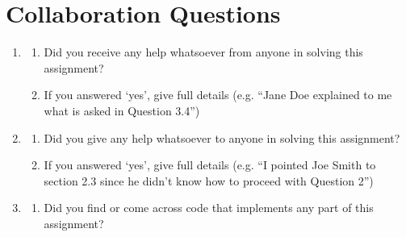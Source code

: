 \section{Collaboration Questions}

\begin{enumerate}
    \item 
    \begin{enumerate}
        \item Did you receive any help whatsoever from anyone in solving this assignment? 
        
        \item If you answered `yes', give full details (e.g. “Jane Doe explained to me what is asked in Question 3.4”)\\
        
        \begin{tcolorbox}[fit,height=4cm, width=15cm, blank, borderline={1pt}{-2pt},nobeforeafter]
\begin{answer}
        
        
\end{answer}
        \end{tcolorbox}
        
    \end{enumerate}
    
    
    \item 
    \begin{enumerate}
        \item Did you give any help whatsoever to anyone in solving this assignment? 

        
        \item If you answered `yes', give full details (e.g. “I pointed Joe Smith to section 2.3 since he didn’t know how to proceed with Question 2”)\\
        
        \begin{tcolorbox}[fit,height=4cm, width=15cm, blank, borderline={1pt}{-2pt},nobeforeafter]
\begin{answer}
        
        
\end{answer}
        \end{tcolorbox}
        
    \end{enumerate}
    
    \item 
    \begin{enumerate}
        \item Did you find or come across code that implements any part of this assignment?


\end{enumerate}
\end{enumerate}
